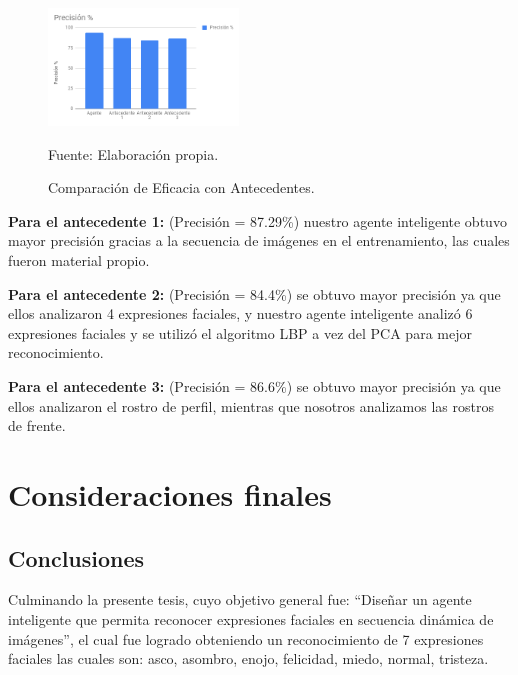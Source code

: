 \begin{figure}[ht]
\begin{center}
\includegraphics[width=0.45\textwidth]{Imagen32}
\end{center}
\begin{center}
\vskip -0.5cm
\caption{\small{Comparación de Eficacia con Antecedentes.}}
{\small{Fuente: Elaboración propia.}}
\end{center}
\end{figure}

\vskip 3cm

{\bf Para el antecedente 1:} (Precisión = 87.29\%) nuestro agente inteligente obtuvo mayor precisión gracias a la secuencia de imágenes en el entrenamiento, las cuales fueron material propio. 
\vskip 0.1cm

{\bf Para el antecedente 2:} (Precisión = 84.4\%) se obtuvo mayor precisión ya que ellos analizaron 4 expresiones faciales, y nuestro agente inteligente analizó 6 expresiones faciales y se utilizó el algoritmo LBP a vez del PCA para mejor reconocimiento.
\vskip 0.1cm

{\bf Para el antecedente 3:} (Precisión = 86.6\%) se obtuvo mayor precisión ya que ellos analizaron el rostro de perfil, mientras que nosotros analizamos las rostros de frente.

\chapter{Consideraciones finales}

\section{Conclusiones}

Culminando la presente tesis, cuyo objetivo general fue: “Diseñar un agente inteligente que permita reconocer expresiones faciales en secuencia dinámica de imágenes”, el cual fue logrado obteniendo un reconocimiento de 7 expresiones faciales las cuales son: asco, asombro, enojo, felicidad, miedo, normal, tristeza.
\vskip 0.3cm

